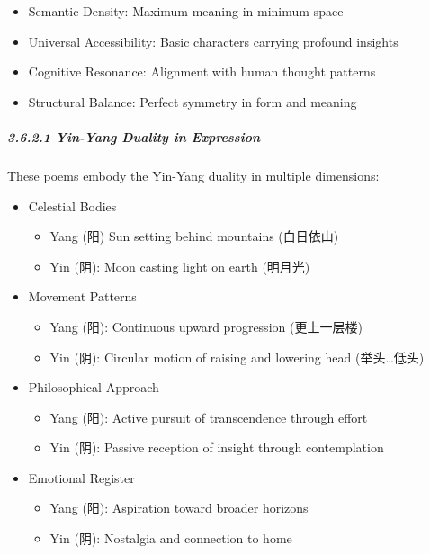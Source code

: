 \documentclass[
  11pt,
  letterpaper,
]{article}
\providecommand{\tightlist}{%
  \setlength{\itemsep}{0pt}\setlength{\parskip}{0pt}}
\begin{document}
\begin{itemize}
\tightlist
\item
  Semantic Density: Maximum meaning in minimum space
\item
  Universal Accessibility: Basic characters carrying profound insights
\item
  Cognitive Resonance: Alignment with human thought patterns
\item
  Structural Balance: Perfect symmetry in form and meaning
\end{itemize}

\subparagraph{3.6.2.1 Yin-Yang Duality in
Expression}\label{yin-yang-duality-in-expression}

These poems embody the Yin-Yang duality in multiple dimensions:

\begin{itemize}
\tightlist
\item
  Celestial Bodies

  \begin{itemize}
  \tightlist
  \item
    Yang (阳) Sun setting behind mountains (白日依山)
  \item
    Yin (阴): Moon casting light on earth (明月光)
  \end{itemize}
\item
  Movement Patterns

  \begin{itemize}
  \tightlist
  \item
    Yang (阳): Continuous upward progression (更上一层楼)
  \item
    Yin (阴): Circular motion of raising and lowering head
    (举头\ldots 低头)
  \end{itemize}
\item
  Philosophical Approach

  \begin{itemize}
  \tightlist
  \item
    Yang (阳): Active pursuit of transcendence through effort
  \item
    Yin (阴): Passive reception of insight through contemplation
  \end{itemize}
\item
  Emotional Register

  \begin{itemize}
  \tightlist
  \item
    Yang (阳): Aspiration toward broader horizons
  \item
    Yin (阴): Nostalgia and connection to home
  \end{itemize}
\end{itemize}
\end{document}
